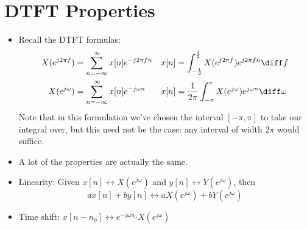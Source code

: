 \section{DTFT Properties}
\begin{itemize}
	\item Recall the DTFT formulas:
		\begin{align*}
			X(e^{j 2 \pi f}) &= \sum_{n=-\infty}^{\infty} x[n] e^{-j 2 \pi f n} & x[n] &= 
			\int_{-\frac{1}{2}}^{\frac{1}{2}} X(e^{j 2\pi f})e^{j 2 \pi f n}\diff f \\
			X(e^{j \omega}) &= \sum_{n=-\infty}^{\infty} x[n] e^{-j \omega n} & x[n] &= \frac{1}{2\pi}
			\int_{-\pi}^{\pi} X(e^{j \omega}) e^{j \omega n}\diff \omega 
		\end{align*}
		Note that in this formulation we've chosen the interval \( [-\pi, \pi] \) to take our integral over, but 
		this need not be the case: any interval of width \( 2\pi \) would suffice.  
	\item A lot of the properties are actually the same.  
	\item Linearity: Given \( x[n] \leftrightarrow X(e^{j \omega}) \) and \( y[n] \leftrightarrow 
		Y(e^{j \omega})\), then 
		\[
			ax[n] + by[n] \leftrightarrow aX(e^{j \omega}) + bY(e^{j \omega})
		\] 
	\item Time shift: \( x[n - n_0] \leftrightarrow e^{-j \omega n_0}X(e^{j \omega})  \)
\end{itemize}
